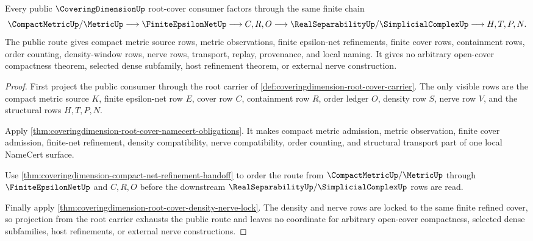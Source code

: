 \begin{theorem}
\label{thm:coveringdimension-root-cover-public-scope}
Every public $\CoveringDimensionUp$ root-cover consumer factors through the same finite chain
$$
\CompactMetricUp/\MetricUp
\longrightarrow
\FiniteEpsilonNetUp
\longrightarrow
C,R,O
\longrightarrow
\RealSeparabilityUp/\SimplicialComplexUp
\longrightarrow
H,T,P,N .
$$
The public route gives compact metric source rows, metric observations, finite epsilon-net refinements, finite cover rows, containment rows, order counting, density-window rows, nerve rows, transport, replay, provenance, and local naming. It gives no arbitrary open-cover compactness theorem, selected dense subfamily, host refinement theorem, or external nerve construction.
\end{theorem}
\begin{proof}
First project the public consumer through the root carrier of \autoref{def:coveringdimension-root-cover-carrier}. The only visible rows are the compact metric source $K$, finite epsilon-net row $E$, cover row $C$, containment row $R$, order ledger $O$, density row $S$, nerve row $V$, and the structural rows $H,T,P,N$.

Apply \autoref{thm:coveringdimension-root-cover-namecert-obligations}. It makes compact metric admission, metric observation, finite cover admission, finite-net refinement, density compatibility, nerve compatibility, order counting, and structural transport part of one local NameCert surface.

Use \autoref{thm:coveringdimension-compact-net-refinement-handoff} to order the route from $\CompactMetricUp/\MetricUp$ through $\FiniteEpsilonNetUp$ and $C,R,O$ before the downstream $\RealSeparabilityUp/\SimplicialComplexUp$ rows are read.

Finally apply \autoref{thm:coveringdimension-root-cover-density-nerve-lock}. The density and nerve rows are locked to the same finite refined cover, so projection from the root carrier exhausts the public route and leaves no coordinate for arbitrary open-cover compactness, selected dense subfamilies, host refinements, or external nerve constructions.
\end{proof}

